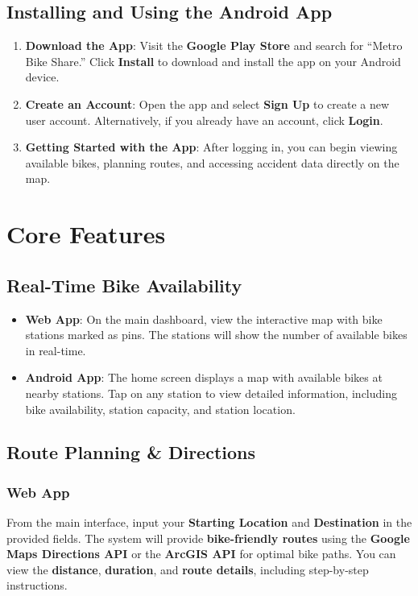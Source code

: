 \documentclass[12pt]{article}
\begin{document}
\subsection{Installing and Using the Android App}
\begin{enumerate}
    \item \textbf{Download the App}: Visit the \textbf{Google Play Store} and search for “Metro Bike Share.” Click \textbf{Install} to download and install the app on your Android device.
    \item \textbf{Create an Account}: Open the app and select \textbf{Sign Up} to create a new user account. Alternatively, if you already have an account, click \textbf{Login}.
    \item \textbf{Getting Started with the App}: After logging in, you can begin viewing available bikes, planning routes, and accessing accident data directly on the map.
\end{enumerate}

\section{Core Features}

\subsection{Real-Time Bike Availability}
\begin{itemize}
    \item \textbf{Web App}: On the main dashboard, view the interactive map with bike stations marked as pins. The stations will show the number of available bikes in real-time.
    \item \textbf{Android App}: The home screen displays a map with available bikes at nearby stations. Tap on any station to view detailed information, including bike availability, station capacity, and station location.
\end{itemize}

\subsection{Route Planning \& Directions}
\subsubsection*{Web App}
From the main interface, input your \textbf{Starting Location} and \textbf{Destination} in the provided fields. The system will provide \textbf{bike-friendly routes} using the \textbf{Google Maps Directions API} or the \textbf{ArcGIS API} for optimal bike paths. You can view the \textbf{distance}, \textbf{duration}, and \textbf{route details}, including step-by-step instructions.
\end{document}
